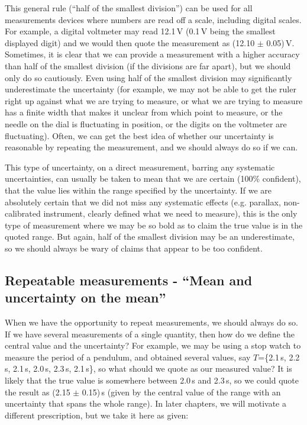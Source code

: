 
This general rule (``half of the smallest division'') can be used for all measurements devices where numbers are read off a scale, including digital scales. For example, a digital voltmeter may read 12.1\,V (0.1\,V being the smallest displayed digit) and we would then quote the measurement as (12.10 $\pm$ 0.05)\,V. Sometimes, it is clear that we can provide a measurement with a higher accuracy than half of the smallest division (if the divisions are far apart), but we should only do so cautiously. Even using half of the smallest division may significantly underestimate the uncertainty (for example, we may not be able to get the ruler right up against what we are trying to measure, or what we are trying to measure has a finite width that makes it unclear from which point to measure, or the needle on the dial is fluctuating in position, or the digits on the voltmeter are fluctuating). Often, we can get the best idea of whether our uncertainty is reasonable by repeating the measurement, and we should always do so if we can. 

This type of uncertainty, on a direct measurement, barring any systematic uncertainties, can usually be taken to mean that we are certain (100\% confident), that the value lies within the range specified by the uncertainty. If we are absolutely certain that we did not miss any systematic effects (e.g. parallax, non-calibrated instrument, clearly defined what we need to measure), this is the only type of measurement where we may be so bold as to claim the true value is in the quoted range. But again, half of the smallest division may be an underestimate, so we should always be wary of claims that appear to be too confident.

\subsection{Repeatable measurements - ``Mean and uncertainty on the mean''}
When we have the opportunity to repeat measurements, we should always do so. If we have several measurements of a single quantity, then how do we define the central value and the uncertainty? For example, we may be using a stop watch to measure the period of a pendulum, and obtained several values, say $T$=\{2.1\,s, 2.2\,s, 2.1\,s, 2.0\,s, 2.3\,s, 2.1\,s\}, so what should we quote as our measured value? It is likely that the true value is somewhere between 2.0\,s and 2.3\,s, so we could quote the result as (2.15 $\pm$ 0.15)\,s (given by the central value of the range with an uncertainty that spans the whole range). In later chapters, we will motivate a different prescription, but we take it here as given:

